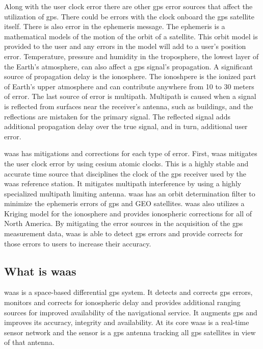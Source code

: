 Along with the user clock error there are other \ac{gps} error sources that
affect the utilization of \ac{gps}. There could be errors with the clock
onboard the \ac{gps} satellite itself. There is also error in the ephemeris
message. The ephemeris is a mathematical models of the motion of the
orbit of a satellite. This orbit model is provided to the user and any
errors in the model will add to a user's position error. Temperature,
pressure and humidity in the troposphere, the lowest layer of the
Earth's atmosphere, can also affect a \ac{gps} signal's propagation. A
significant source of propagation delay is the ionosphere. The
ionoshpere is the ionized part of Earth's upper atmosphere and can
contribute anywhere from 10 to 30 meters of error. The last source of
error is multipath. Multipath is caused when a signal is reflected from
surfaces near the receiver's antenna, such as buildings, and the
reflections are mistaken for the primary signal. The reflected signal
adds additional propagation delay over the true signal, and in turn,
additional user error.

\ac{waas} has mitigations and corrections for each type of error. First, \ac{waas}
mitigates the user clock error by using cesium atomic clocks. This is a
highly stable and accurate time source that disciplines the clock of the
\ac{gps} receiver used by the \ac{waas} reference station. It mitigates multipath
interference by using a highly specialized multipath limiting antenna.
\ac{waas} has an orbit determination filter to minimize the ephemeris errors
of \ac{gps} and GEO satellites. \ac{waas} also utilizes a Kriging model for the
ionosphere and provides ionospheric corrections for all of North
America. By mitigating the error sources in the acquisition of the \ac{gps}
measurement data, \ac{waas} is able to detect \ac{gps} errors and provide corrects
for those errors to users to increase their accuracy.

\subsection{What is \ac{waas}}\label{what-is-the-wide-area-augmentation-system-waas}

\ac{waas} is a space-based differential
\ac{gps} system. It detects and corrects \ac{gps} errors, monitors and corrects
for ionospheric delay and provides additional ranging sources for
improved availability of the navigational service. It augments \ac{gps} and
improves its accuracy, integrity and availability. At its core \ac{waas} is a real-time sensor network and the
sensor is a \ac{gps} antenna tracking all \ac{gps} satellites in view of that
antenna.

